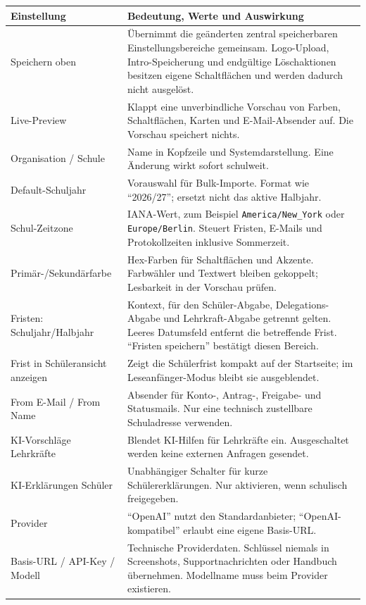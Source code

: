 \documentclass[12pt,a4paper]{article}
\begin{document}
\small
\begin{longtable}{|p{}|p{}|}
\hline
\textbf{Einstellung} & \textbf{Bedeutung, Werte und Auswirkung}\\
\hline
Speichern oben & Übernimmt die geänderten zentral speicherbaren Einstellungsbereiche gemeinsam. Logo-Upload, Intro-Speicherung und endgültige Löschaktionen besitzen eigene Schaltflächen und werden dadurch nicht ausgelöst.\\
\hline
Live-Preview & Klappt eine unverbindliche Vorschau von Farben, Schaltflächen, Karten und E-Mail-Absender auf. Die Vorschau speichert nichts.\\
\hline
Organisation / Schule & Name in Kopfzeile und Systemdarstellung. Eine Änderung wirkt sofort schulweit.\\
\hline
Default-Schuljahr & Vorauswahl für Bulk-Importe. Format wie \enquote{2026/27}; ersetzt nicht das aktive Halbjahr.\\
\hline
Schul-Zeitzone & IANA-Wert, zum Beispiel \texttt{America/New\_York} oder \texttt{Europe/Berlin}. Steuert Fristen, E-Mails und Protokollzeiten inklusive Sommerzeit.\\
\hline
Primär-/Sekundärfarbe & Hex-Farben für Schaltflächen und Akzente. Farbwähler und Textwert bleiben gekoppelt; Lesbarkeit in der Vorschau prüfen.\\
\hline
Fristen: Schuljahr/Halbjahr & Kontext, für den Schüler-Abgabe, Delegations-Abgabe und Lehrkraft-Abgabe getrennt gelten. Leeres Datumsfeld entfernt die betreffende Frist. \enquote{Fristen speichern} bestätigt diesen Bereich.\\
\hline
Frist in Schüleransicht anzeigen & Zeigt die Schülerfrist kompakt auf der Startseite; im Leseanfänger-Modus bleibt sie ausgeblendet.\\
\hline
From E-Mail / From Name & Absender für Konto-, Antrag-, Freigabe- und Statusmails. Nur eine technisch zustellbare Schuladresse verwenden.\\
\hline
KI-Vorschläge Lehrkräfte & Blendet KI-Hilfen für Lehrkräfte ein. Ausgeschaltet werden keine externen Anfragen gesendet.\\
\hline
KI-Erklärungen Schüler & Unabhängiger Schalter für kurze Schülererklärungen. Nur aktivieren, wenn schulisch freigegeben.\\
\hline
Provider & \enquote{OpenAI} nutzt den Standardanbieter; \enquote{OpenAI-kompatibel} erlaubt eine eigene Basis-URL.\\
\hline
Basis-URL / API-Key / Modell & Technische Providerdaten. Schlüssel niemals in Screenshots, Supportnachrichten oder Handbuch übernehmen. Modellname muss beim Provider existieren.\\

\end{longtable}
\end{document}
